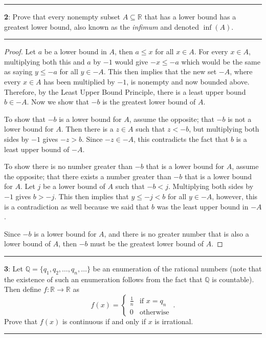 \documentclass[11pt]{article}
\newcommand\question[2]{\vspace{.25in}\hrule\textbf{#1}: #2\vspace{.5em}\hrule\vspace{.10in}}
\newcommand{\R}{\mathbb{R}}
\newcommand{\Q}{\mathbb{Q}}
\begin{document}
\question{2}{Prove that every nonempty subset $A\subseteq\mathbb{R}$ that has a lower bound has a greatest lower bound, also known as the \textit{infimum} and denoted $\inf(A)$.}
\begin{proof}
	Let $a$ be a lower bound in $A$, then $a \le x$ for all $x \in A$. For every $x \in A$, multiplying both this and $a$ by $-1$ would give $-x \le -a$ which would be the same as saying $y \le -a$ for all $y \in -A$. This then implies that the new set $-A$, where every $ x \in A$ has been multiplied by $-1$, is nonempty and now bounded above. Therefore, by the Least Upper Bound Principle, there is a least upper bound $b \in -A$. Now we show that $-b$ is the greatest lower bound of $A$.

	To show that $-b$ is a lower bound for $A$, assume the opposite; that $-b$ is not a lower bound for $A$. Then there is a $z \in A$ such that $z < -b$, but multiplying both sides by $-1$ gives $-z > b$. Since $-z \in -A$, this contradicts the fact that $b$ is a least upper bound of $-A$.

	To show there is no number greater than $-b$ that is a lower bound for $A$, assume the opposite; that there exists a number greater than $-b$ that is a lower bound for $A$. Let $j$ be a lower bound of $A$ such that $-b < j$. Multiplying both sides by $-1$ gives $b > -j$. This then implies that $y \le -j < b$ for all $y \in -A$, however, this is a contradiction as well because we said that $b$ was the least upper bound in $-A$. 

	Since $-b$ is a lower bound for $A$, and there is no greater number that is also a lower bound of $A$, then $-b$ must be the greatest lower bound of $A$.
\end{proof}

\newpage

\question{3}{Let $\Q = \{q_1, q_2, \ldots, q_n, \ldots\}$ be an enumeration of the rational numbers (note that the existence of such an enumeration follows from the fact that $\Q$ is countable). Then define $f:\R \rightarrow \R$ as
\begin{equation*}
		f(x) =
		\begin{cases}
			\frac{1}{n} & \text{if $x=q_n$}\\
			0 & \text{otherwise}
		\end{cases}\,.
\end{equation*}
Prove that $f(x)$ is continuous if and only if $x$ is irrational.}
\end{document}
